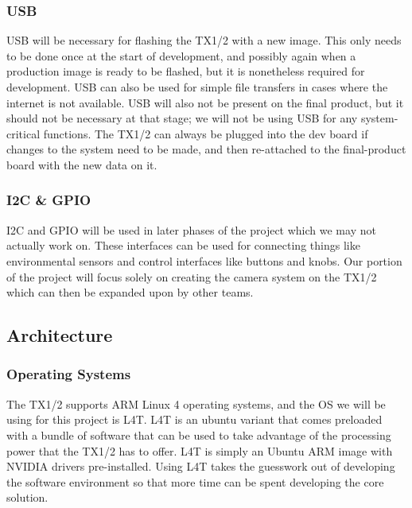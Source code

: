 \documentclass[letterpaper,10pt,serif,draftclsnofoot,onecolumn,compsoc,titlepage]{IEEEtran}
\begin{document}
\subsubsection{USB}

USB will be necessary for flashing the TX1/2 with a new image. This only needs to be 
done once at the start of development, and possibly again when a production image is 
ready to be flashed, but it is nonetheless required for development. USB can also be 
used for simple file transfers in cases where the internet is not available. USB will 
also not be present on the final product, but it should not be necessary at that stage; 
we will not be using USB for any system-critical functions. The TX1/2 can always be 
plugged into the dev board if changes to the system need to be made, and then 
re-attached to the final-product board with the new data on it.\\

\subsubsection{I2C \& GPIO}

I2C and GPIO will be used in later phases of the project which we may not actually 
work on. These interfaces can be used for connecting things like environmental sensors 
and control interfaces like buttons and knobs. Our portion of the project will focus 
solely on creating the camera system on the TX1/2 which can then be expanded upon by 
other teams. \\

\subsection{Architecture}

\subsubsection{Operating Systems}

The TX1/2 supports ARM Linux 4 operating systems, and the OS we will be using for this 
project is L4T. L4T is an ubuntu variant that comes preloaded with a 
bundle of software that can be used to take advantage of the processing power that 
the TX1/2 has to offer. L4T is simply an Ubuntu ARM image with NVIDIA drivers 
pre-installed. Using L4T takes the guesswork out of developing the software 
environment so that more time can be spent developing the core solution. \\
\end{document}
